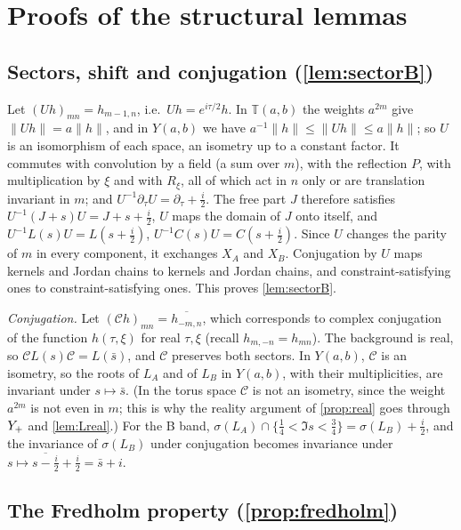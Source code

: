 \section{Proofs of the structural lemmas}\label{app:lemmas}

\subsection{Sectors, shift and conjugation (\cref{lem:sectorB})}\label{app:sectors}

Let $(Uh)_{mn}=h_{m-1,n}$, i.e.\ $Uh=e^{i\tau/2}h$. In $\mathbb T(a,b)$ the weights $a^{2m}$ give
$\|Uh\|=a\|h\|$, and in $Y(a,b)$ we have $a^{-1}\|h\|\le\|Uh\|\le a\|h\|$; so $U$ is an isomorphism of each space,
an isometry up to a constant factor. It commutes with convolution by a field (a sum over $m$), with the reflection
$P$, with multiplication by $\xi$ and with $R_\xi$, all of which act in $n$ only or are translation invariant in
$m$; and $U^{-1}\partial_\tau U=\partial_\tau+\tfrac i2$. The free part $J$ therefore satisfies
$U^{-1}(J+s)U=J+s+\tfrac i2$, $U$ maps the domain of $J$ onto itself, and $U^{-1}L(s)U=L(s+\tfrac i2)$,
$U^{-1}C(s)U=C(s+\tfrac i2)$. Since $U$ changes the parity of $m$ in every component, it exchanges $X_A$ and $X_B$.
Conjugation by $U$ maps kernels and Jordan chains to kernels and Jordan chains, and constraint-satisfying ones to
constraint-satisfying ones. This proves \cref{lem:sectorB}.

\emph{Conjugation.} Let $(\mathcal Ch)_{mn}=\overline{h_{-m,n}}$, which corresponds to complex conjugation of the
function $h(\tau,\xi)$ for real $\tau,\xi$ (recall $h_{m,-n}=h_{mn}$). The background is real, so
$\mathcal C L(s)\mathcal C=L(\bar s)$, and $\mathcal C$ preserves both sectors. In $Y(a,b)$, $\mathcal C$ is an
isometry, so the roots of $L_A$ and of $L_B$ in $Y(a,b)$, with their multiplicities, are invariant under
$s\mapsto\bar s$. (In the torus space $\mathcal C$ is not an isometry, since the weight $a^{2m}$ is not even in $m$;
this is why the reality argument of \cref{prop:real} goes through $Y_{+}$ and \cref{lem:Lreal}.) For the B band,
$\sigma(L_A)\cap\{\tfrac14<\Im s<\tfrac34\}=\sigma(L_B)+\tfrac i2$, and the invariance of $\sigma(L_B)$ under
conjugation becomes invariance under $s\mapsto\overline{s-\tfrac i2}+\tfrac i2=\bar s+i$.

\subsection{The Fredholm property (\cref{prop:fredholm})}\label{app:fredholm}

